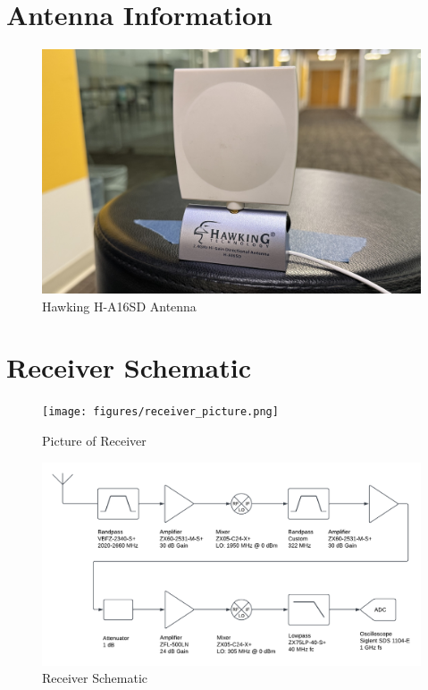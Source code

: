 \documentclass[letterpaper,12pt]{article}
\begin{document}
\section{Antenna Information}
\begin{figure}[H]
	\begin{centering}
		\includegraphics[width=0.8\columnwidth]{figures/antenna}
		\caption{Hawking H-A16SD Antenna}
	\end{centering}
\end{figure}

\newpage
\section{Receiver Schematic}
\begin{figure}[H]
	\begin{centering}
		\texttt{[image: figures/receiver\_picture.png]}
		\caption{Picture of Receiver}
	\end{centering}
\end{figure}

\begin{figure}[H]
	\begin{centering}
		\includegraphics[width=1\columnwidth]{figures/receiver_schematic.pdf}
		\caption{Receiver Schematic}
	\end{centering}
\end{figure}
\end{document}
